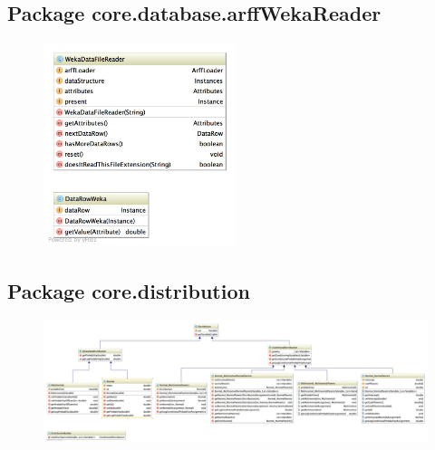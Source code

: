 \subsection{Package core.database.arffWekaReader}
\begin{figure}[H]
  \centering
    \includegraphics[width=0.5\textwidth]{ClassDiagrams/core_database_filereaders_arffwekareader.jpg}
\end{figure}

\subsection{Package core.distribution}
\begin{figure}[H]
  \centering
    \includegraphics[width=\textwidth]{ClassDiagrams/core_distribution.jpg}
\end{figure}

